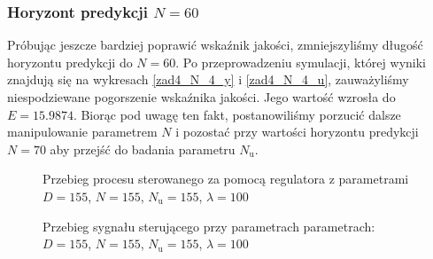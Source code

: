 \subsubsection{Horyzont predykcji $N = \num{60}$}
Próbując jeszcze bardziej poprawić wskaźnik jakości, zmniejszyliśmy długość horyzontu predykcji do $N = \num{60}$.
Po przeprowadzeniu symulacji, której wyniki znajdują się na wykresach \ref{zad4_N_4_y} i \ref{zad4_N_4_u}, 
zauważyliśmy niespodziewane pogorszenie wskaźnika jakości. Jego wartość wzrosła do $E = \num{15,9874}$.
Biorąc pod uwagę ten fakt, postanowiliśmy porzucić dalsze manipulowanie parametrem $N$ i pozostać przy
wartości horyzontu predykcji $N = \num{70}$ aby przejść do badania parametru $N_{\mathrm{u}}$.

\begin{figure}[t]
    \centering
    \caption{Przebieg procesu sterowanego za pomocą regulatora z parametrami $D = 155$, $N = 155$, $N_{\mathrm{u}} = 155$, $\lambda = 100$}
    \label{zad4_N_1_y}
\end{figure}

\begin{figure}[b]
    \centering
    \caption{Przebieg sygnału sterującego przy parametrach parametrach: $D = 155$, $N = 155$, $N_{\mathrm{u}} = 155$, $\lambda = 100$}
    \label{zad4_N_1_u}
\end{figure}
\FloatBarrier

